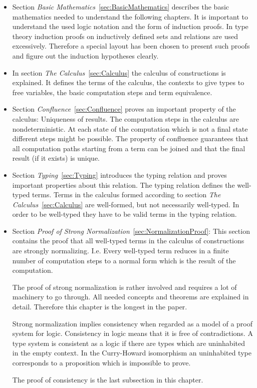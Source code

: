 \begin{itemize}

\item Section \emph{Basic Mathematics}~\ref{sec:BasicMathematics} describes the
basic mathematics needed to understand the following chapters. It is important
to understand the used logic notation and the form of induction proofs. In type
theory induction proofs on inductively defined sets and relations are used
excessively. Therefore a special layout has been chosen to present such proofs
and figure out the induction hypotheses clearly.

\item In section \emph{The Calculus}~\ref{sec:Calculus} the calculus of
constructions is explained. It defines the terms of the calculus, the contexts
to give types to free variables, the basic computation steps and term
equivalence.


\item Section \emph{Confluence}~\ref{sec:Confluence} proves an important
property of the calculus: Uniqueness of results. The computation steps in the
calculus are nondeterministic. At each state of the computation which is not a
final state different steps might be possible. The property of confluence
guarantees that all computation paths starting from a term can be joined and
that the final result (if it exists) is unique.

\item Section \emph{Typing}~\ref{sec:Typing} introduces the typing relation and
proves important properties about this relation. The typing relation defines the
well-typed terms. Terms in the calculus formed according to section \emph{The
Calculus}~\ref{sec:Calculus} are well-formed, but not necessarily well-typed. In
order to be well-typed they have to be valid terms in the typing relation.


\item Section \emph{Proof of Strong Normalization}~\ref{sec:NormalizationProof}:
This section contains the proof that all well-typed terms in the calculus of
constructions are strongly normalizing. I.e. Every well-typed term reduces in a
finite number of computation steps to a normal form which is the result of the
computation.

The proof of strong normalization is rather involved and requires a lot of
machinery to go through. All needed concepts and theorems are explained in
detail. Therefore this chapter is the longest in the paper.

Strong normalization implies consistency when regarded
as a model of a proof system for logic. Consistency in logic means that it is
free of contradictions. A type system is consistent as a logic if there are
types which are uninhabited in the empty context. In the Curry-Howard
isomorphism an uninhabited type corresponds to a proposition which is
impossible to prove.

The proof of consistency is the last subsection in this chapter.

\end{itemize}
